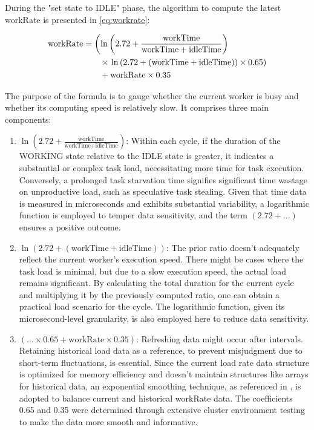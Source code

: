 \documentclass{mproj}
\begin{document}
During the "set state to IDLE" phase, the algorithm to compute the latest workRate is presented in \cref{eq:workrate}:

\begin{align}
    \text{workRate} & = \left( \ln\left( 2.72 + \frac{\text{workTime}}{\text{workTime} + \text{idleTime}} \right) \right. \notag   \\
                    & \qquad \times \left. \ln\left( 2.72 + (\text{workTime} + \text{idleTime}) \right) \times 0.65 \right) \notag \\
                    & \qquad + \text{workRate} \times 0.35 \label{eq:workrate}
\end{align}

The purpose of the formula is to gauge whether the current worker is busy and whether its computing speed is relatively slow. It comprises three main components:
\begin{enumerate}
    \item $\ln\left( 2.72 + \frac{\text{workTime}}{\text{workTime} + \text{idleTime}} \right)$:
          Within each cycle, if the duration of the WORKING state relative to the IDLE state is greater,
          it indicates a substantial or complex task load, necessitating more time for task execution.
          Conversely, a prolonged task starvation time signifies significant time wastage on unproductive load,
          such as speculative task stealing.
          Given that time data is measured in microseconds and exhibits substantial variability,
          a logarithmic function is employed to temper data sensitivity,
          and the term $(2.72+...)$ ensures a positive outcome.

    \item $\ln\left( 2.72 + (\text{workTime} + \text{idleTime}) \right)$:
          The prior ratio doesn't adequately reflect the current worker's execution speed.
          There might be cases where the task load is minimal,
          but due to a slow execution speed, the actual load remains significant.
          By calculating the total duration for the current cycle and multiplying it by the previously computed ratio,
          one can obtain a practical load scenario for the cycle.
          The logarithmic function, given its microsecond-level granularity, is also employed here to reduce data sensitivity.

    \item $(... \times 0.65 +\text{workRate} \times 0.35)$:
          Refreshing data might occur after intervals.
          Retaining historical load data as a reference, to prevent misjudgment due to short-term fluctuations, is essential.
          Since the current load rate data structure is optimized for memory efficiency and doesn't maintain structures like arrays for historical data,
          an exponential smoothing technique, as referenced in \cite{GARDNER2006637},
          is adopted to balance current and historical workRate data.
          The coefficients 0.65 and 0.35 were determined through extensive cluster environment testing
          to make the data more smooth and informative.
\end{enumerate}
\end{document}
